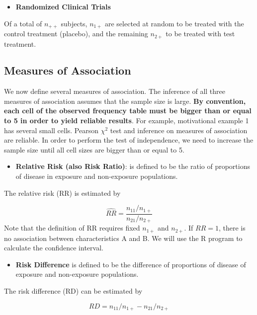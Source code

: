 \documentclass[
]{book}
\providecommand{\tightlist}{%
  \setlength{\itemsep}{0pt}\setlength{\parskip}{0pt}}
\begin{document}
\begin{itemize}
\tightlist
\item
  \textbf{Randomized Clinical Trials}
\end{itemize}

Of a total of \(n_{++}\) subjects, \(n_{1+}\) are selected at random to be treated with the control treatment (placebo), and the remaining \(n_{2+}\) to be treated with test treatment.

\hypertarget{measures-of-association-1}{%
\subsection{Measures of Association}\label{measures-of-association-1}}

We now define several measures of association. The inference of all three measures of association assumes that the sample size is large. \textbf{By convention, each cell of the observed frequency table must be bigger than or equal to 5 in order to yield reliable results}. For example, motivational example 1 has several small cells. Pearson \(\chi^2\) test and inference on measures of association are reliable. In order to perform the test of independence, we need to increase the sample size until all cell sizes are bigger than or equal to 5.

\begin{itemize}
\tightlist
\item
  \textbf{Relative Risk (also Risk Ratio)}: is defined to be the ratio of proportions of disease in exposure and non-exposure populations.
\end{itemize}

The relative risk (RR) is estimated by

\[
\widehat{RR} = \frac{n_{11}/n_{1+}}{n_{21}/n_{2+}}
\]
Note that the definition of RR requires fixed \(n_{1+}\) and \(n_{2+}\). If \(RR = 1\), there is no association between characteristics A and B. We will use the R program to calculate the confidence interval.

\begin{itemize}
\tightlist
\item
  \textbf{Risk Difference} is defined to be the difference of proportions of disease of exposure and non-exposure populations.
\end{itemize}

The risk difference (RD) can be estimated by

\[
RD = n_{11}/n_{1+} - n_{21}/n_{2+}
\]
\end{document}
